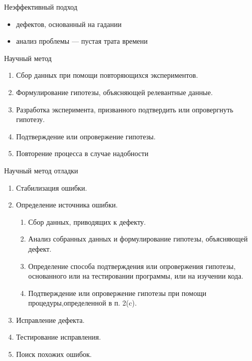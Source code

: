 \documentclass[10pt,pdf,hyperref={unicode}]{beamer}%
\begin{document}
\begin{frame}{Неэффективный подход}
        \begin{itemize}
          \item {  дефектов,  основанный  на  гадании}
          \item { анализ проблемы — пустая трата времени}
        \end{itemize}
\end{frame}

\begin{frame}{Научный метод}

  \begin{enumerate}
  \item Сбор  данных  при  помощи  повторяющихся  экспериментов.
  \item Формулирование  гипотезы,  объясняющей  релевантные  данные.
  \item Разработка  эксперимента,  призванного  подтвердить  или  опровергнуть  гипотезу.
  \item Подтверждение  или  опровержение  гипотезы.
  \item Повторение  процесса  в  случае  надобности
\end{enumerate}


\end{frame}

\begin{frame}{Научный метод отладки}

  \begin{enumerate}
  \item Стабилизация  ошибки.
  \item Определение  источника  ошибки.
        \begin{enumerate}
          \item Сбор  данных,  приводящих  к  дефекту.
          \item Анализ собранных данных и формулирование гипотезы, объясняющей дефект.
          \item Определение  способа  подтверждения  или  опровержения  гипотезы,  основанного  или  на  тестировании  программы,  или  на  изучении  кода.
          \item Подтверждение  или  опровержение  гипотезы  при  помощи  процедуры,определенной  в  п. 2(c).
        \end{enumerate}
  \item Исправление  дефекта.
  \item Тестирование  исправления.
  \item Поиск  похожих  ошибок.
\end{enumerate}

\end{frame}
\end{document}
